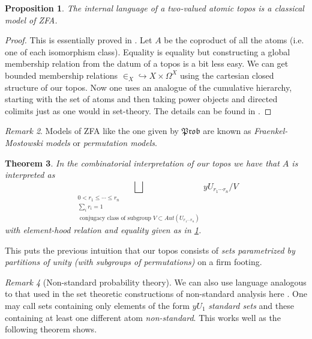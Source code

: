 \documentclass[a4paper]{amsproc}
\theoremstyle{plain}
\newtheorem{theorem}{Theorem}[section]
\newtheorem{proposition}[theorem]{Proposition}
\theoremstyle{definition}
\theoremstyle{remark}
\newtheorem{remark}[theorem]{Remark}
\numberwithin{equation}{section}
\begin{document}
\begin{proposition}\label{ZFA} The internal language of a two-valued atomic topos is a classical model of ZFA.
\end{proposition}
\begin{proof} 
This is essentially proved in \cite{set_theory}.
Let $A$ be the coproduct of all the atoms (i.e. one of each isomorphism class).
 Equality is equality but constructing a global membership relation from the datum of a topos is a bit less easy.\newline
\indent We can get bounded membership relations $\in_X\hookrightarrow X\times \Omega^X$ using the cartesian closed structure of our topos.\newline
\indent Now one uses an analogue of the cumulative hierarchy, starting with the set of atoms and then taking power objects and directed colimits just as one would in set-theory. The details can be found in \cite{set_theory}.
\end{proof}
\begin{remark} Models of ZFA like the one given by $\mathfrak{Prob}$ are known as \emph{Fraenkel-Mostowski models} or \emph{permutation models}.
\end{remark}
\begin{theorem}
In the combinatorial interpretation of our topos we have that $A$ is interpreted as \\\[\bigsqcup_{\substack{0<r_1\leq  \cdots\leq r_n \\ \sum_i r_i=1 \\ [V]\text{ conjugacy class of subgroup }V\subset Aut(U_{r_1\cdots r_n})}} yU_{r_1\cdots r_n}/V\]%
 with element-hood relation and equality given as in \ref{ZFA}.
 \end{theorem}
 This puts the previous intuition that our topos consists of \emph{sets parametrized by partitions of unity (with subgroups of permutations)} on a firm footing.
\begin{remark}[Non-standard probability theory] We can also use language analogous to that used in the set theoretic constructions of non-standard analysis here \cite{XYZ} . One may call sets containing only elements of the form $yU_1$ \emph{standard sets} and these containing at least one different atom \emph{non-standard}. This works well as the following theorem shows. %
\end{remark}
\end{document}
